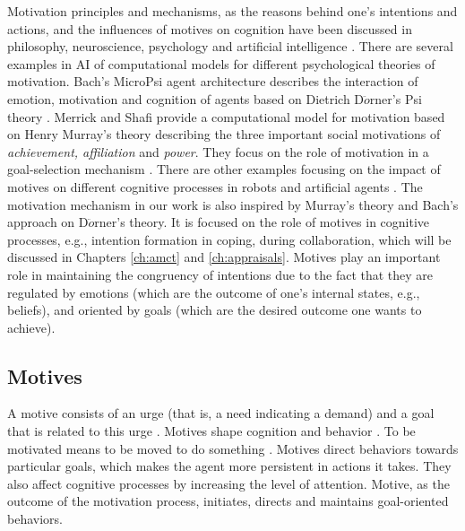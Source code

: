 \documentclass[12pt]{report}
\begin{document}
Motivation principles and mechanisms, as the reasons behind one's intentions and
actions, and the influences of motives on cognition have been discussed in
philosophy, neuroscience, psychology and artificial intelligence
\cite{bach:motivaitional-system-ai, berridge:motivation-concepts-neuroscience,
brody:motivation-goal-action, simon:motivation-emotion-cognition,
sloman:motivation}. There are several examples in AI of computational models for
different psychological theories of motivation. Bach's MicroPsi agent
architecture describes the interaction of emotion, motivation and cognition of
agents based on Dietrich D$\ddot{o}$rner's Psi theory
\cite{bach:micropsi-agent-architecture, bach:psi, bach:motivaitional-system-ai,
bach:next-generation-micropsi}. Merrick and Shafi provide a computational model
for motivation based on Henry Murray's theory
\cite{murray:personality-exploration} describing the three important social
motivations of \textit{achievement, affiliation} and \textit{power}. They focus
on the role of motivation in a goal-selection mechanism
\cite{merrick:acheievement-affiliation-power}. There are other examples focusing
on the impact of motives on different cognitive processes in robots and
artificial agents \cite{breazeal:motivation-regulating-hri,
dolores:socially-emotional, deSevin:motivational-model-agent,
sellers:comprehensive-emotion-theory, velasquez:emotions-motivations-agents,
wright:implementation-agent-architecture}. The motivation mechanism in our work
is also inspired by Murray's theory and Bach's approach on D$\ddot{o}$rner's
theory. It is focused on the role of motives in cognitive processes, e.g.,
intention formation in coping, during collaboration, which will be discussed in
Chapters \ref{ch:amct} and \ref{ch:appraisals}. {\color{red}Motives play an
important role in maintaining the congruency of intentions due to the fact that
they are regulated by emotions (which are the outcome of one's internal
states, e.g., beliefs), and oriented by goals (which are the desired outcome one
wants to achieve).}

\subsection{Motives}

A motive consists of an urge (that is, a need indicating a demand) and a goal
that is related to this urge \cite{bach:psi}. Motives shape cognition and
behavior \cite{schultheiss:implicit-motive}. To be motivated means to be moved
to do something \cite{ryan:intrinsic-extrinsic-motivations}. Motives direct
behaviors towards particular goals, which makes the agent more persistent in
actions it takes. They also affect cognitive processes by increasing the level
of attention. Motive, as the outcome of the motivation process, initiates,
directs and maintains goal-oriented behaviors.
\end{document}

